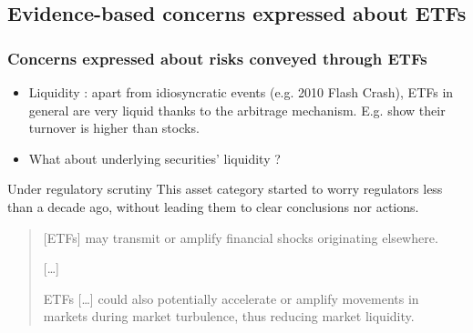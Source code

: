 \documentclass[handout, 9pt, usenames, dvipsnames]{beamer}
\begin{document}
\subsection{Evidence-based concerns expressed about ETFs}
\begin{frame}
  \frametitle{Concerns expressed about risks conveyed through ETFs}
  \begin{itemize}
  \item Liquidity : apart from idiosyncratic events (e.g. 2010 Flash Crash), ETFs in general are very liquid thanks to the arbitrage mechanism. E.g. \textcite{Ben-David2018} show their turnover is higher than stocks.
  \item What about underlying securities' liquidity ?
  \end{itemize}
  \begin{alertblock}{Under regulatory scrutiny}
    This asset category started to worry regulators less than a decade ago, without leading them to clear conclusions nor actions.
    \begin{quotation}
      [ETFs] may transmit or amplify financial shocks originating elsewhere.

      [\dots]

      ETFs [\dots] could also potentially accelerate or amplify movements in markets during market turbulence, thus reducing market liquidity.
    \end{quotation}
  \end{alertblock}
  
\end{frame}
\end{document}
